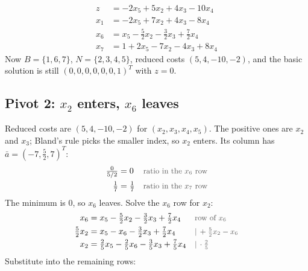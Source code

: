 \documentclass[a4paper,11pt]{article}
\newif\ifexplain
\newcommand{\teil}[1]{\subsection*{#1}}
\newcommand{\why}[1]{\text{\small\color{black!65}#1}}
\newcommand{\explain}[1]{\ifexplain\begin{erklbox}#1\end{erklbox}\fi}
\begin{document}
\[
\begin{aligned}
z &= -2x_5 + 5x_2 + 4x_3 - 10x_4\\
x_1 &= -2x_5 + 7x_2 + 4x_3 - 8x_4\\
x_6 &= x_5 - \tfrac52 x_2 - \tfrac32 x_3 + \tfrac72 x_4\\
x_7 &= 1 + 2x_5 - 7x_2 - 4x_3 + 8x_4
\end{aligned}
\]
Now $B=\{1,6,7\}$, $N=\{2,3,4,5\}$, reduced costs $(5,4,-10,-2)$, and the basic solution is still $(0,0,0,0,0,0,1)^T$ with $z=0$.
\explain{Der Pivot ist degeneriert: Die Schrittweite ist $0$, $x_1$ kommt mit Wert $0$ in die Basis, $x_5$ verlässt sie mit Wert $0$. Die Ecke und $z$ ändern sich nicht. Die Basiswerte bestätigen das: $x_1=x_6=0$, $x_7=1$ wie vorher.}

\teil{Pivot 2: $x_2$ enters, $x_6$ leaves}
Reduced costs are $(5,4,-10,-2)$ for $(x_2,x_3,x_4,x_5)$. The positive ones are $x_2$ and $x_3$; Bland's rule picks the smaller index, so $x_2$ enters. Its column has $\bar a = (-7,\tfrac52,7)^T$:
\begin{align*}
\tfrac{0}{5/2} &= 0 && \why{ratio in the $x_6$ row}\\
\tfrac{1}{7} &= \tfrac17 && \why{ratio in the $x_7$ row}
\end{align*}
The minimum is $0$, so $x_6$ leaves. Solve the $x_6$ row for $x_2$:
\begin{align*}
x_6 &= x_5 - \tfrac52 x_2 - \tfrac32 x_3 + \tfrac72 x_4 && \why{row of $x_6$}\\
\tfrac52 x_2 &= x_5 - x_6 - \tfrac32 x_3 + \tfrac72 x_4 && \why{$|\,+\tfrac52 x_2 - x_6$}\\
x_2 &= \tfrac25 x_5 - \tfrac25 x_6 - \tfrac35 x_3 + \tfrac75 x_4 && \why{$|\,\cdot \tfrac25$}
\end{align*}
Substitute into the remaining rows:
\end{document}
